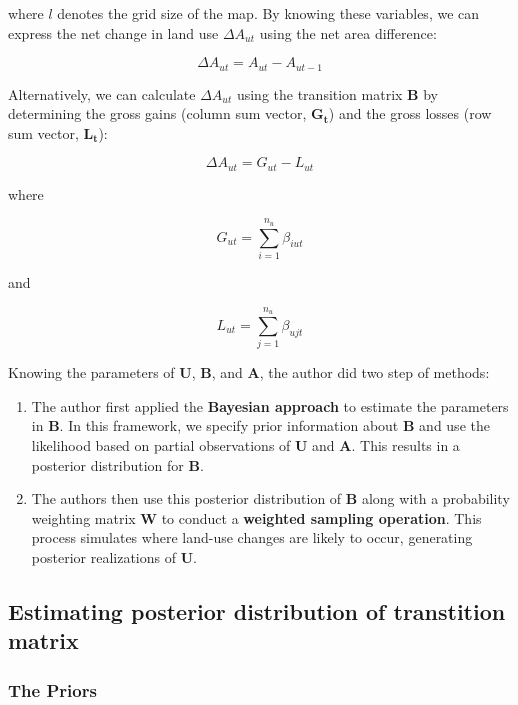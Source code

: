 \documentclass[
  letterpaper,
  DIV=11,
  numbers=noendperiod]{scrartcl}
\begin{document}
where \(l\) denotes the grid size of the map. By knowing these
variables, we can express the net change in land use \(\Delta A_{ut}\)
using the net area difference:

\[
\Delta A_{ut} = A_{ut} - A_{ut-1} \tag{2}
\]

Alternatively, we can calculate \(\Delta A_{ut}\) using the transition
matrix \(\mathbf{B}\) by determining the gross gains (column sum vector,
\(\mathbf{G_t}\)) and the gross losses (row sum vector,
\(\mathbf{L_t}\)):

\[
\Delta A_{ut} = G_{ut} - L_{ut} \tag{4}
\]

where

\[
G_{ut} = \sum_{i=1}^{n_u} \beta_{iut}
\]

and

\[
L_{ut} = \sum_{j=1}^{n_u} \beta_{ujt}
\]

Knowing the parameters of \(\mathbf{U}\), \(\mathbf{B}\), and
\(\mathbf{A}\), the author did two step of methods:

\begin{enumerate}
\def\labelenumi{\arabic{enumi}.}
\item
  The author first applied the \textbf{Bayesian approach} to estimate
  the parameters in \(\mathbf{B}\). In this framework, we specify prior
  information about \(\mathbf{B}\) and use the likelihood based on
  partial observations of \(\mathbf{U}\) and \(\mathbf{A}\). This
  results in a posterior distribution for \(\mathbf{B}\).
\item
  The authors then use this posterior distribution of \(\mathbf{B}\)
  along with a probability weighting matrix \(\mathbf{W}\) to conduct a
  \textbf{weighted sampling operation}. This process simulates where
  land-use changes are likely to occur, generating posterior
  realizations of \(\mathbf{U}\).
\end{enumerate}

\hypertarget{estimating-posterior-distribution-of-transtition-matrix}{%
\subsection{Estimating posterior distribution of transtition
matrix}\label{estimating-posterior-distribution-of-transtition-matrix}}

\hypertarget{the-priors}{%
\subsubsection{The Priors}\label{the-priors}}
\end{document}
